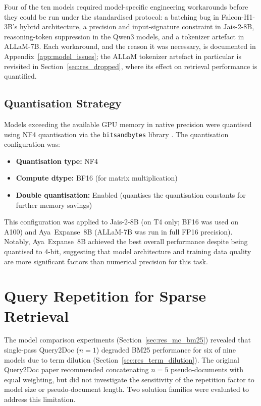Four of the ten models required model-specific engineering workarounds before they could be run under the standardised protocol: a batching bug in Falcon-H1-3B's hybrid architecture, a precision and input-signature constraint in Jais-2-8B, reasoning-token suppression in the Qwen3 models, and a tokenizer artefact in ALLaM-7B. Each workaround, and the reason it was necessary, is documented in Appendix~\ref{app:model_issues}; the ALLaM tokenizer artefact in particular is revisited in Section~\ref{sec:res_dropped}, where its effect on retrieval performance is quantified.

\subsection{Quantisation Strategy}
\label{sec:meth_quantisation}

Models exceeding the available GPU memory in native precision were quantised using NF4 quantisation via the \texttt{bitsandbytes} library \cite{dettmers_2023_qlora}. The quantisation configuration was:

\begin{itemize}
    \item \textbf{Quantisation type:} NF4
    \item \textbf{Compute dtype:} BF16 (for matrix multiplication)
    \item \textbf{Double quantisation:} Enabled (quantises the quantisation constants for further memory savings)
\end{itemize}

This configuration was applied to Jais-2-8B (on T4 only; BF16 was used on A100) and Aya~Expanse~8B (ALLaM-7B was run in full FP16 precision). Notably, Aya~Expanse~8B achieved the best overall performance despite being quantised to 4-bit, suggesting that model architecture and training data quality are more significant factors than numerical precision for this task.

\section{Query Repetition for Sparse Retrieval}
\label{sec:meth_repetition}

The model comparison experiments (Section~\ref{sec:res_mc_bm25}) revealed that single-pass Query2Doc ($n=1$) degraded BM25 performance for six of nine models due to term dilution (Section~\ref{sec:res_term_dilution}). The original Query2Doc paper \cite{wang_2023_query2doc} recommended concatenating $n=5$ pseudo-documents with equal weighting, but did not investigate the sensitivity of the repetition factor to model size or pseudo-document length. Two solution families were evaluated to address this limitation.

